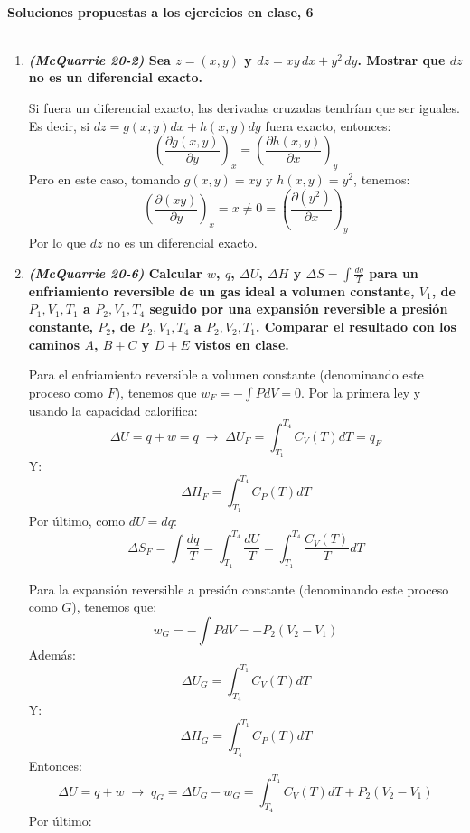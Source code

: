 \documentclass[a4paper,12pt]{article}
\begin{document}

\begin{center}
\HRule \\[0.4cm]
{ \bfseries Soluciones propuestas a los ejercicios en clase, 6}\\ %
\HRule \\[0.4cm]
\end{center}


\begin{enumerate}

 \item \textbf{\textit{(McQuarrie 20-2)} Sea $z=(x,y)$ y $dz=xy\,dx+y^2\,dy$. Mostrar que $dz$ no es un diferencial exacto.} %

Si fuera un diferencial exacto, las derivadas cruzadas tendr\'ian que ser iguales. Es decir, si $dz=g(x,y)dx+h(x,y)dy$ fuera exacto, entonces: 
$$\left(\frac{\partial g(x,y)}{\partial y}\right)_x=\left(\frac{\partial h(x,y)}{\partial x}\right)_y$$
Pero en este caso, tomando $g(x,y)=xy$ y $h(x,y)=y^2$, tenemos:
$$\left(\frac{\partial (xy)}{\partial y}\right)_x=x\neq0=\left(\frac{\partial (y^2)}{\partial x}\right)_y$$
Por lo que $dz$ no es un diferencial exacto.

 \item \textbf{\textit{(McQuarrie 20-6)} Calcular $w$, $q$, $\Delta U$, $\Delta H$ y $\Delta S=\int\frac{dq}{T}$ para un enfriamiento reversible de un gas ideal a volumen constante, $V_1$, de $P_1, V_1, T_1$ a $P_2, V_1, T_4$ seguido por una expansi\'on reversible a presi\'on constante, $P_2$, de $P_2, V_1, T_4$ a $P_2, V_2, T_1$. Comparar el resultado con los caminos $A$, $B+C$ y $D+E$ vistos en clase.} %

Para el enfriamiento reversible a volumen constante (denominando este proceso como $F$), tenemos que $w_F=-\int PdV=0$. Por la primera ley y usando la capacidad calor\'ifica: 
$$\Delta U=q+w=q\;\rightarrow\;\Delta U_F=\int_{T_1}^{T_4}C_V(T)dT=q_F$$ 
Y: 
$$\Delta H_F=\int_{T_1}^{T_4}C_P(T)dT$$
Por \'ultimo, como $dU=dq$:
$$\Delta S_F=\int\frac{dq}{T}=\int_{T_1}^{T_4}\frac{dU}{T}=\int_{T_1}^{T_4}\frac{C_V(T)}{T}dT$$

Para la expansi\'on reversible a presi\'on constante (denominando este proceso como $G$), tenemos que: 
$$w_G=-\int PdV=-P_2(V_2-V_1)$$
Adem\'as:
$$\Delta U_G=\int_{T_4}^{T_1}C_V(T)dT$$
Y: 
$$\Delta H_G=\int_{T_4}^{T_1}C_P(T)dT$$
Entonces: 
$$\Delta U=q+w\;\rightarrow\;q_G=\Delta U_G-w_G=\int_{T_4}^{T_1}C_V(T)dT+P_2(V_2-V_1)$$ 
Por \'ultimo:


\end{enumerate}
\end{document}
